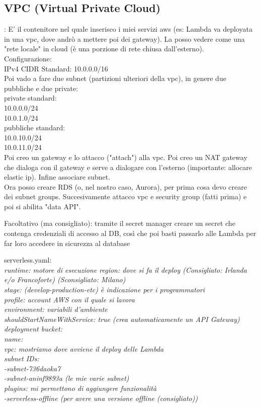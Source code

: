 \documentclass{classes/base}
\begin{document}
    \subsection*{VPC (Virtual Private Cloud)}:
    E' il contenitore nel quale inserisco i miei servizi aws (es: Lambda va deployata in una vpc, dove andrò a mettere poi dei gateway).
    La posso vedere come una "rete locale" in cloud (è una porzione di rete chiusa dall'esterno).\\
    Configurazione:\\
    IPv4 CIDR Standard: 10.0.0.0/16 \\
    Poi vado a fare due subnet (partizioni ulteriori della vpc), in genere due pubbliche e due private:\\
    private standard:\\
    10.0.0.0/24\\
    10.0.1.0/24\\
    pubbliche standard:\\
    10.0.10.0/24\\
    10.0.11.0/24\\
    Poi creo un gateway e lo attacco ("attach") alla vpc. Poi creo un NAT gateway che dialoga con il gateway e serve a dialogare con l'esterno (importante: allocare elastic ip).
    Infine associare subnet. \\

    Ora posso creare RDS (o, nel nostro caso, Aurora), per prima cosa devo creare dei subnet groups.
    Succesivamente attacco vpc e security group (fatti prima) e poi si abilita "data API".

    Facoltativo (ma consigliato): tramite il secret manager creare un secret che contenga credenziali di accesso al DB, così che poi basti passarlo alle Lambda per far loro accedere in sicurezza al database

    serverless.yaml:\\
    
    \textit{
    runtime: motore di esecuzione
    region: dove si fa il deploy (Consigliato: Irlanda e/o Francoforte) (Sconsigliato: Milano)\\
    stage: (develop-production-etc)  è indicazione per i programmatori\\
    profile: account AWS con il quale si lavora\\
    environment: variabili d'ambiente\\
    shouldStartNameWithService: true (crea automaticamente un API Gateway)\\ 
    deployment bucket:\\
        name:\\
    vpc: mostriamo dove avviene il deploy delle Lambda\\
        subnet IDs:\\
                -subnet-736daoka7\\ 
                -subnet-aninf9893a  (le mie varie subnet)\\ 
    plugins: mi permettono di aggiungere funzionalità\\
        -serverless-offline (per avere una versione offline (consigliato))}\\
\end{document}
